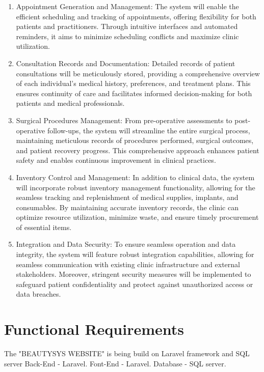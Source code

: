\documentclass{scrreprt}
\begin{document}
\begin{enumerate}
\item Appointment Generation and Management: The system will enable the efficient scheduling and tracking of appointments, offering flexibility for both patients and practitioners. Through intuitive interfaces and automated reminders, it aims to minimize scheduling conflicts and maximize clinic utilization.

\item Consultation Records and Documentation: Detailed records of patient consultations will be meticulously stored, providing a comprehensive overview of each individual's medical history, preferences, and treatment plans. This ensures continuity of care and facilitates informed decision-making for both patients and medical professionals.

\item Surgical Procedures Management: From pre-operative assessments to post-operative follow-ups, the system will streamline the entire surgical process, maintaining meticulous records of procedures performed, surgical outcomes, and patient recovery progress. This comprehensive approach enhances patient safety and enables continuous improvement in clinical practices.

\item Inventory Control and Management: In addition to clinical data, the system will incorporate robust inventory management functionality, allowing for the seamless tracking and replenishment of medical supplies, implants, and consumables. By maintaining accurate inventory records, the clinic can optimize resource utilization, minimize waste, and ensure timely procurement of essential items.

\item Integration and Data Security: To ensure seamless operation and data integrity, the system will feature robust integration capabilities, allowing for seamless communication with existing clinic infrastructure and external stakeholders. Moreover, stringent security measures will be implemented to safeguard patient confidentiality and protect against unauthorized access or data breaches.
\end{enumerate}

\section{Functional Requirements}
The "BEAUTYSYS WEBSITE" is being build on Laravel framework and SQL server
\newline
Back-End - Laravel.
\newline
Font-End - Laravel.
\newline
Database -  SQL server.
\end{document}
